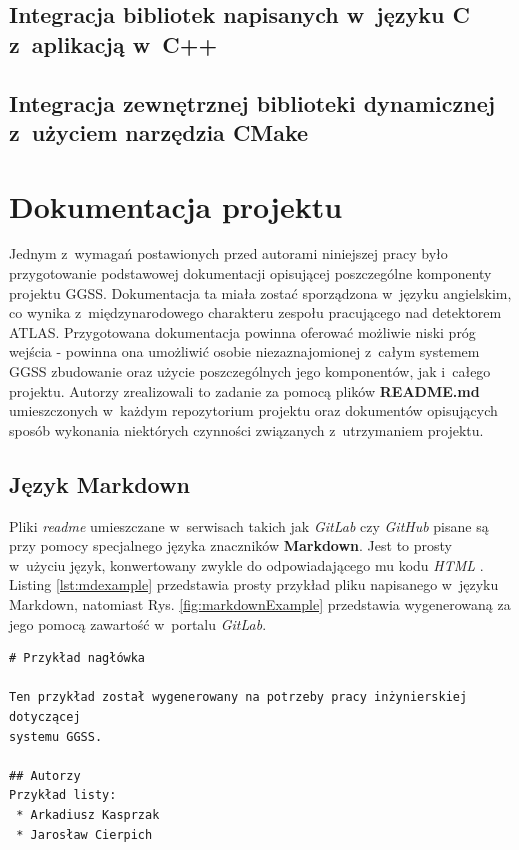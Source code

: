 \subsection{Integracja bibliotek napisanych w~języku C z~aplikacją w~C++}


\subsection{Integracja zewnętrznej biblioteki dynamicznej z~użyciem narzędzia CMake}

\newpage
\section{Dokumentacja projektu}
Jednym z~wymagań postawionych przed autorami niniejszej pracy było przygotowanie podstawowej dokumentacji opisującej poszczególne komponenty projektu GGSS. Dokumentacja ta miała zostać sporządzona w~języku angielskim, co wynika z~międzynarodowego charakteru zespołu pracującego nad detektorem ATLAS. Przygotowana dokumentacja powinna oferować możliwie niski próg wejścia - powinna ona umożliwić osobie niezaznajomionej z~całym systemem GGSS zbudowanie oraz użycie poszczególnych jego komponentów, jak i~całego projektu. Autorzy zrealizowali to zadanie za pomocą plików \textbf{README.md} umieszczonych w~każdym repozytorium projektu oraz dokumentów opisujących sposób wykonania niektórych czynności związanych z~utrzymaniem projektu.

\subsection{Język Markdown}
Pliki \textit{readme} umieszczane w~serwisach takich jak \textit{GitLab} czy \textit{GitHub} pisane są przy pomocy specjalnego języka znaczników \textbf{Markdown}. Jest to prosty w~użyciu język, konwertowany zwykle do odpowiadającego mu kodu \textit{HTML} \cite{Markdown1}. Listing \ref{lst:mdexample} przedstawia prosty przykład pliku napisanego w~języku Markdown, natomiast Rys. \ref{fig:markdownExample} przedstawia wygenerowaną za jego pomocą zawartość w~portalu \textit{GitLab}.

\begin{lstlisting}[caption={Przykład prostego pliku napisanego w~języku Markdown}, label={lst:mdexample}]
# Przykład nagłówka

Ten przykład został wygenerowany na potrzeby pracy inżynierskiej dotyczącej 
systemu GGSS.

## Autorzy
Przykład listy:
 * Arkadiusz Kasprzak
 * Jarosław Cierpich
\end{lstlisting}

